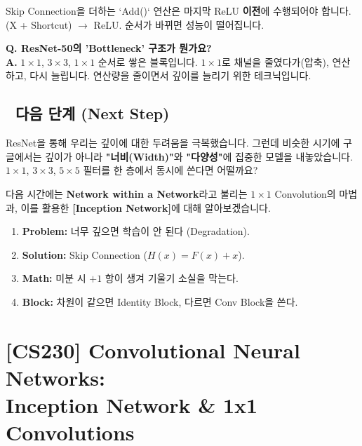 \documentclass[11pt,a4paper]{book}
\theoremstyle{definition}
\begin{document}
\begin{warningbox}[title={ReLU 위치 주의}]
Skip Connection을 더하는 `Add()` 연산은 마지막 ReLU \textbf{이전}에 수행되어야 합니다.
(X + Shortcut) $\rightarrow$ ReLU. 순서가 바뀌면 성능이 떨어집니다.
\end{warningbox}

\textbf{Q. ResNet-50의 'Bottleneck' 구조가 뭔가요?} \\
\textbf{A.} $1 \times 1$, $3 \times 3$, $1 \times 1$ 순서로 쌓은 블록입니다.
$1 \times 1$로 채널을 줄였다가(압축), 연산하고, 다시 늘립니다. 연산량을 줄이면서 깊이를 늘리기 위한 테크닉입니다.

\section*{🔗 다음 단계 (Next Step)}
ResNet을 통해 우리는 깊이에 대한 두려움을 극복했습니다.
그런데 비슷한 시기에 구글에서는 깊이가 아니라 \textbf{"너비(Width)"}와 \textbf{"다양성"}에 집중한 모델을 내놓았습니다. $1 \times 1$, $3 \times 3$, $5 \times 5$ 필터를 한 층에서 동시에 쓴다면 어떨까요?

다음 시간에는 \textbf{Network within a Network}라고 불리는 $1 \times 1$ Convolution의 마법과, 이를 활용한 \textbf{[Inception Network]}에 대해 알아보겠습니다.

\vspace{0.5cm}

\begin{summarybox}[title={단원 요약 (Cheat Sheet)}]
\begin{enumerate}
    \item \textbf{Problem:} 너무 깊으면 학습이 안 된다 (Degradation).
    \item \textbf{Solution:} Skip Connection ($H(x) = F(x) + x$).
    \item \textbf{Math:} 미분 시 $+1$ 항이 생겨 기울기 소실을 막는다.
    \item \textbf{Block:} 차원이 같으면 Identity Block, 다르면 Conv Block을 쓴다.
\end{enumerate}
\end{summarybox}


\chapter{[CS230] Convolutional Neural Networks: \\ Inception Network \& 1x1 Convolutions}
\label{ch:lecture33}
\end{document}
